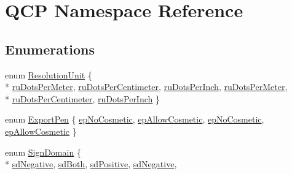 \hypertarget{namespace_q_c_p}{}\section{Q\+CP Namespace Reference}
\label{namespace_q_c_p}
\subsection*{Enumerations}
\begin{DoxyCompactItemize}
\item 
enum \hyperlink{namespace_q_c_p_a715d46153da230990aa887d0f0602452}{Resolution\+Unit} \{ \\*
\hyperlink{namespace_q_c_p_a715d46153da230990aa887d0f0602452a35bd2504f1a53bae238cc860a6302e33}{ru\+Dots\+Per\+Meter}, 
\hyperlink{namespace_q_c_p_a715d46153da230990aa887d0f0602452a02d47fd51bd0b99ae0b1cc6703646817}{ru\+Dots\+Per\+Centimeter}, 
\hyperlink{namespace_q_c_p_a715d46153da230990aa887d0f0602452a9def6fd83de9b4108ad999541a42ac6a}{ru\+Dots\+Per\+Inch}, 
\hyperlink{namespace_q_c_p_a715d46153da230990aa887d0f0602452a35bd2504f1a53bae238cc860a6302e33}{ru\+Dots\+Per\+Meter}, 
\\*
\hyperlink{namespace_q_c_p_a715d46153da230990aa887d0f0602452a02d47fd51bd0b99ae0b1cc6703646817}{ru\+Dots\+Per\+Centimeter}, 
\hyperlink{namespace_q_c_p_a715d46153da230990aa887d0f0602452a9def6fd83de9b4108ad999541a42ac6a}{ru\+Dots\+Per\+Inch}
 \}
\item 
enum \hyperlink{namespace_q_c_p_a17844f19e1019693a953e1eb93536d2f}{Export\+Pen} \{ \hyperlink{namespace_q_c_p_a17844f19e1019693a953e1eb93536d2faec51f17ee42178094138e69ac73daa52}{ep\+No\+Cosmetic}, 
\hyperlink{namespace_q_c_p_a17844f19e1019693a953e1eb93536d2fa34716c7388ad3a2ff3ac27e57fb83a5b}{ep\+Allow\+Cosmetic}, 
\hyperlink{namespace_q_c_p_a17844f19e1019693a953e1eb93536d2faec51f17ee42178094138e69ac73daa52}{ep\+No\+Cosmetic}, 
\hyperlink{namespace_q_c_p_a17844f19e1019693a953e1eb93536d2fa34716c7388ad3a2ff3ac27e57fb83a5b}{ep\+Allow\+Cosmetic}
 \}
\item 
enum \hyperlink{namespace_q_c_p_afd50e7cf431af385614987d8553ff8a9}{Sign\+Domain} \{ \\*
\hyperlink{namespace_q_c_p_afd50e7cf431af385614987d8553ff8a9a0b464fa3135be2808909739a969193c9}{sd\+Negative}, 
\hyperlink{namespace_q_c_p_afd50e7cf431af385614987d8553ff8a9a3dee7e9cd2fedce9253b83e172626a6c}{sd\+Both}, 
\hyperlink{namespace_q_c_p_afd50e7cf431af385614987d8553ff8a9a23362334a52289677a51526a9b68db6c}{sd\+Positive}, 
\hyperlink{namespace_q_c_p_afd50e7cf431af385614987d8553ff8a9a0b464fa3135be2808909739a969193c9}{sd\+Negative}, 

\end{DoxyCompactItemize}
